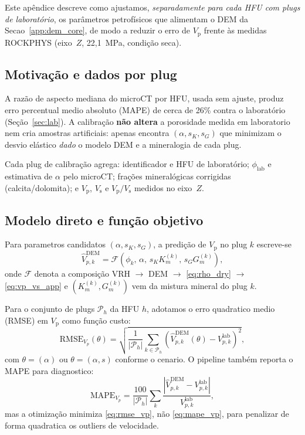 \documentclass[11pt,a4paper]{article}
\numberwithin{equation}{section}
\newcommand{\Vp}{\ensuremath{V_{\mathrm{p}}}}
\newcommand{\Vs}{\ensuremath{V_{\mathrm{s}}}}
\newcommand{\VpVs}{\ensuremath{V_{\mathrm{p}}/V_{\mathrm{s}}}}
\begin{document}
Este apêndice descreve como ajustamos, \emph{separadamente para cada HFU com
plugs de laboratório}, os parâmetros petrofísicos que alimentam o DEM da
Secao~\ref{app:dem_core}, de modo a reduzir o erro de \Vp{} frente às
medidas ROCKPHYS (eixo~$Z$, 22,1~MPa, condição seca).

\subsection{Motivação e dados por plug}

A razão de aspecto mediana do microCT por HFU, usada sem ajuste, produz
erro percentual medio absoluto (MAPE) de cerca de 26\% contra o laboratório
(Seção~\ref{sec:lab}).
A calibração \textbf{não altera} a porosidade medida em laboratorio nem cria
amostras artificiais: apenas encontra $(\alpha, s_K, s_G)$ que minimizam o
desvio elástico \emph{dado} o modelo DEM e a mineralogia de cada plug.

Cada plug de calibração agrega: identificador e HFU de laboratório;
$\phi_{\mathrm{lab}}$ e estimativa de $\alpha$ pelo microCT; frações
mineralógicas corrigidas (calcita/dolomita); e \Vp, \Vs{} e \VpVs{} medidos
no eixo~$Z$.

\subsection{Modelo direto e função objetivo}

Para parametros candidatos $(\alpha, s_K, s_G)$, a predição de \Vp{} no plug
$k$ escreve-se
\begin{equation}
  \widehat{V}_{p,k}^{\mathrm{DEM}}
  = \mathcal{F}\!\left(
      \phi_k,\,\alpha,\,s_K K_m^{(k)},\,s_G G_m^{(k)}
    \right),
  \label{eq:vp_forward}
\end{equation}
onde $\mathcal{F}$ denota a composição VRH $\rightarrow$ DEM
$\rightarrow$ \eqref{eq:rho_dry} $\rightarrow$ \eqref{eq:vp_vs_app} e
$(K_m^{(k)}, G_m^{(k)})$ vem da mistura mineral do plug $k$.

Para o conjunto de plugs $\mathcal{P}_h$ da HFU $h$, adotamos o erro
quadratico medio (RMSE) em \Vp{} como função custo:
\begin{equation}
  \mathrm{RMSE}_{V_p}(\theta)
  = \sqrt{\frac{1}{|\mathcal{P}_h|}
    \sum_{k \in \mathcal{P}_h}
    \left(\widehat{V}_{p,k}^{\mathrm{DEM}}(\theta) - V_{p,k}^{\mathrm{lab}}\right)^2},
  \label{eq:rmse_vp}
\end{equation}
com $\theta = (\alpha)$ ou $\theta = (\alpha, s)$ conforme o cenario.
O pipeline também reporta o MAPE para diagnostico:
\begin{equation}
  \mathrm{MAPE}_{V_p}
  = \frac{100}{|\mathcal{P}_h|}
    \sum_{k}
    \frac{\left|\widehat{V}_{p,k}^{\mathrm{DEM}} - V_{p,k}^{\mathrm{lab}}\right|}
         {V_{p,k}^{\mathrm{lab}}},
  \label{eq:mape_vp}
\end{equation}
mas a otimização minimiza \eqref{eq:rmse_vp}, não \eqref{eq:mape_vp}, para
penalizar de forma quadratica os outliers de velocidade.
\end{document}
